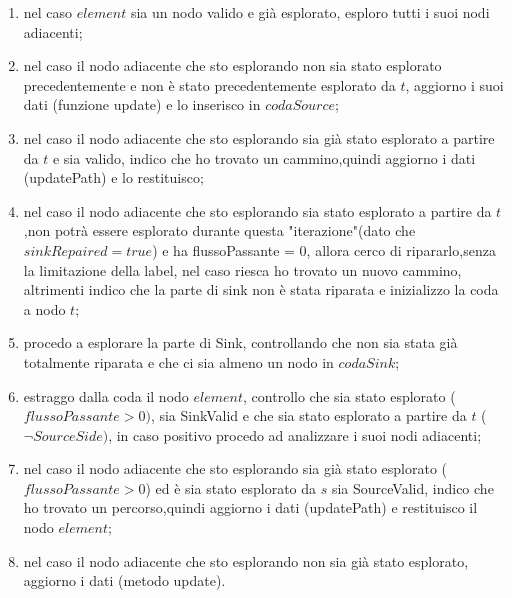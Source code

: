 \documentclass{article}
\begin{document}
\begin{enumerate}
    \item nel caso $element$ sia un nodo valido e già esplorato, esploro tutti i suoi nodi adiacenti;
    \item nel caso il nodo adiacente che sto esplorando non sia stato esplorato precedentemente e non è stato precedentemente esplorato da $t$, aggiorno i suoi dati (funzione update) e lo inserisco in $codaSource$;
    \item nel caso il nodo adiacente che sto esplorando sia già stato esplorato a partire da $t$ e sia valido, indico che ho trovato un cammino,quindi aggiorno i dati (updatePath) e lo restituisco;
    \item nel caso il nodo adiacente che sto esplorando sia stato esplorato a partire da $t$,non potrà essere esplorato durante questa "iterazione"(dato che $ sinkRepaired = true$) e ha flussoPassante = 0, allora cerco di ripararlo,senza la limitazione della label, nel caso riesca ho trovato un nuovo cammino, altrimenti indico che la parte di sink non è stata riparata e inizializzo la coda a nodo $t$;
    \item procedo a esplorare la parte di Sink, controllando che non sia stata già totalmente riparata e che ci sia almeno un nodo in $codaSink$;
    \item estraggo dalla coda il nodo $element$, controllo che sia stato esplorato ($flussoPassante> 0)$, sia SinkValid e che sia stato esplorato a partire da $t$ ($\neg SourceSide)$, in caso positivo procedo ad analizzare i suoi nodi adiacenti;
    \item nel caso il nodo adiacente che sto esplorando sia già stato esplorato ($flussoPassante> 0$) ed è sia stato esplorato da $s$ sia SourceValid, indico che ho trovato un percorso,quindi aggiorno i dati (updatePath) e restituisco il nodo $element$;
    \item nel caso il nodo adiacente che sto esplorando non sia già stato esplorato, aggiorno i dati (metodo update).
\end{enumerate}
\end{document}
